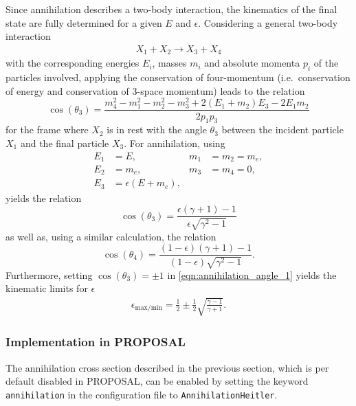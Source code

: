 Since annihilation describes a two-body interaction, the kinematics of the final state are fully determined for a given $E$ and $\epsilon$.
Considering a general two-body interaction 
%
\begin{align*}
	X_1 + X_2 \rightarrow X_3 + X_4
\end{align*}
%
with the corresponding energies $E_i$, masses $m_i$ and absolute momenta $p_i$ of the particles involved, applying the conservation of four-momentum (i.e.\ conservation of energy and conservation of 3-space momentum) leads to the relation \cite{Hirayama:2005zm}
%
\begin{equation}
	\label{eqn:2to2process_angle}
	\cos(\theta_3) = \frac{m_4^2 - m_1^2 - m_2^2 - m_3^2 + 2 (E_1 + m_2) E_3 - 2 E_1 m_2}{2 p_1 p_3}
\end{equation}
%
for the frame where $X_2$ is in rest with the angle $\theta_3$ between the incident particle $X_1$ and the final particle $X_3$.
For annihilation, using
%
\begin{align*}
	E_1 &= E, & m_1 &= m_2 = m_e, \\
	E_2 &= m_e, & m_3 &= m_4 = 0, \\
	E_3 &= \epsilon (E + m_e),
\end{align*}
%
yields the relation
%
\begin{equation}
	\label{eqn:annihilation_angle_1}
	\cos(\theta_3) = \frac{\epsilon (\gamma + 1) - 1}{\epsilon\sqrt{\gamma^2 - 1}}
\end{equation}
%
as well as, using a similar calculation, the relation
%
\begin{equation}
	\label{eqn:annihilation_angle_2}
	\cos(\theta_4) = \frac{(1 - \epsilon) (\gamma + 1) - 1}{(1-\epsilon)\sqrt{\gamma^2 - 1}}.
\end{equation}
%
Furthermore, setting $\cos(\theta_3) = \pm \num{1}$ in \ref{eqn:annihilation_angle_1} yields the kinematic limits for $\epsilon$
%
\begin{align}
	\epsilon_{\text{max/min}} = \frac{1}{2} \pm \frac{1}{2} \sqrt{\frac{\gamma - 1}{\gamma + 1}}.
\end{align}
%

\subsubsection{Implementation in PROPOSAL}

\begin{sloppypar}
The annihilation cross section described in the previous section, which is per default disabled in PROPOSAL, can be enabled by setting the keyword \texttt{annihilation} in the configuration file to \texttt{AnnihilationHeitler}.
\end{sloppypar}

